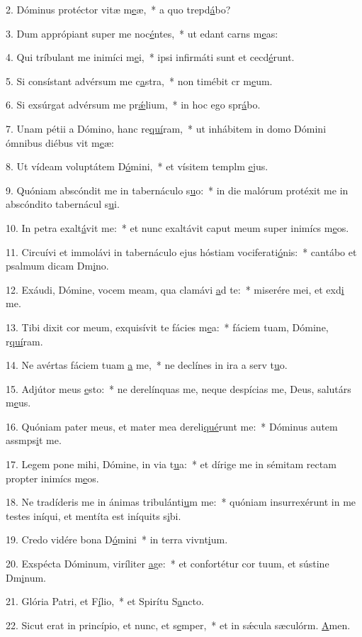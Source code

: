 2. Dóminus protéctor vitæ m\uline{e}æ,~* a quo trepd\uline{á}bo?\par 
3. Dum apprópiant super me noc\uline{é}ntes,~* ut edant carns m\uline{e}as:\par 
4. Qui tríbulant me inimíci m\uline{e}i,~* ipsi infirmáti sunt et cecd\uline{é}runt.\par 
5. Si consístant advérsum me c\uline{a}stra,~* non timébit cr m\uline{e}um.\par 
6. Si exsúrgat advérsum me pr\uline{ǽ}lium,~* in hoc ego spr\uline{á}bo.\par 
7. Unam pétii a Dómino, hanc re\uline{quí}ram,~* ut inhábitem in domo Dómini ómnibus diébus vit m\uline{e}æ:\par 
8. Ut vídeam voluptátem D\uline{ó}mini,~* et vísitem templm \uline{e}jus.\par 
9. Quóniam abscóndit me in tabernáculo s\uline{u}o:~* in die malórum protéxit me in abscóndito tabernácul s\uline{u}i.\par 
10. In petra exalt\uline{á}vit me:~* et nunc exaltávit caput meum super inimícs m\uline{e}os.\par 
11. Circuívi et immolávi in tabernáculo ejus hóstiam vociferati\uline{ó}nis:~* cantábo et psalmum dicam Dm\uline{i}no.\par 
12. Exáudi, Dómine, vocem meam, qua clamávi \uline{a}d te:~* miserére mei, et exd\uline{i} me.\par 
13. Tibi dixit cor meum, exquisívit te fácies m\uline{e}a:~* fáciem tuam, Dómine, r\uline{quí}ram.\par 
14. Ne avértas fáciem tuam \uline{a} me,~* ne declínes in ira a serv t\uline{u}o.\par 
15. Adjútor meus \uline{e}sto:~* ne derelínquas me, neque despícias me, Deus, salutárs m\uline{e}us.\par 
16. Quóniam pater meus, et mater mea dereli\uline{qué}runt me:~* Dóminus autem assmps\uline{i}t me.\par 
17. Legem pone mihi, Dómine, in via t\uline{u}a:~* et dírige me in sémitam rectam propter inimícs m\uline{e}os.\par 
18. Ne tradíderis me in ánimas tribulánti\uline{u}m me:~* quóniam insurrexérunt in me testes iníqui, et mentíta est iníquits s\uline{i}bi.\par 
19. Credo vidére bona D\uline{ó}mini~* in terra vivnt\uline{i}um.\par 
20. Exspécta Dóminum, viríliter \uline{a}ge:~* et confortétur cor tuum, et sústine Dm\uline{i}num.\par 
21. Glória Patri, et F\uline{í}lio,~* et Spirítu S\uline{a}ncto.\par 
22. Sicut erat in princípio, et nunc, et s\uline{e}mper,~* et in sǽcula sæculórm. \uline{A}men.\par 
